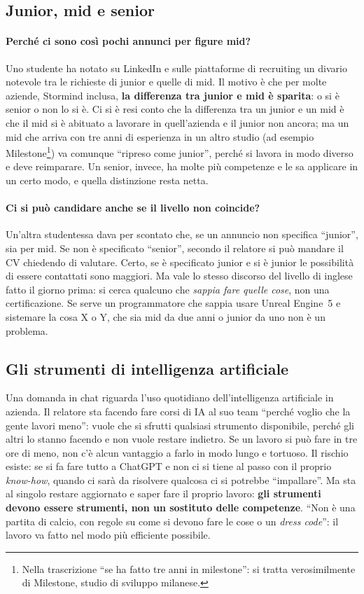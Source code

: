 \subsection{Junior, mid e senior}

\paragraph{Perché ci sono così pochi annunci per figure mid?} Uno studente ha
notato su LinkedIn e sulle piattaforme di recruiting un divario notevole tra le
richieste di junior e quelle di mid. Il motivo è che per molte aziende,
Stormind inclusa, \textbf{la differenza tra junior e mid è sparita}: o si è
senior o non lo si è. Ci si è resi conto che la differenza tra un junior e un
mid è che il mid si è abituato a lavorare in quell'azienda e il junior non
ancora; ma un mid che arriva con tre anni di esperienza in un altro studio (ad
esempio Milestone\footnote{Nella trascrizione ``se ha fatto tre anni in
milestone'': si tratta verosimilmente di Milestone, studio di sviluppo
milanese.}) va comunque ``ripreso come junior'', perché si lavora in modo
diverso e deve reimparare. Un senior, invece, ha molte più competenze e le sa
applicare in un certo modo, e quella distinzione resta netta.

\paragraph{Ci si può candidare anche se il livello non coincide?} Un'altra
studentessa dava per scontato che, se un annuncio non specifica ``junior'', sia
per mid. Se non è specificato ``senior'', secondo il relatore si può mandare il
CV chiedendo di valutare. Certo, se è specificato junior e si è junior le
possibilità di essere contattati sono maggiori. Ma vale lo stesso discorso del
livello di inglese fatto il giorno prima: si cerca qualcuno che \emph{sappia
fare quelle cose}, non una certificazione. Se serve un programmatore che sappia
usare Unreal Engine~5 e sistemare la cosa X o Y, che sia mid da due anni o
junior da uno non è un problema.

\subsection{Gli strumenti di intelligenza artificiale}

Una domanda in chat riguarda l'uso quotidiano dell'intelligenza artificiale in
azienda. Il relatore sta facendo fare corsi di IA al suo team ``perché voglio che
la gente lavori meno'': vuole che si sfrutti qualsiasi strumento disponibile,
perché gli altri lo stanno facendo e non vuole restare indietro. Se un lavoro
si può fare in tre ore di meno, non c'è alcun vantaggio a farlo in modo lungo e
tortuoso. Il rischio esiste: se si fa fare tutto a ChatGPT e non ci si tiene al
passo con il proprio \emph{know-how}, quando ci sarà da risolvere qualcosa ci si
potrebbe ``impallare''. Ma sta al singolo restare aggiornato e saper fare il
proprio lavoro: \textbf{gli strumenti devono essere strumenti, non un sostituto
delle competenze}. ``Non è una partita di calcio, con regole su come si devono
fare le cose o un \emph{dress code}'': il lavoro va fatto nel modo più efficiente
possibile.

